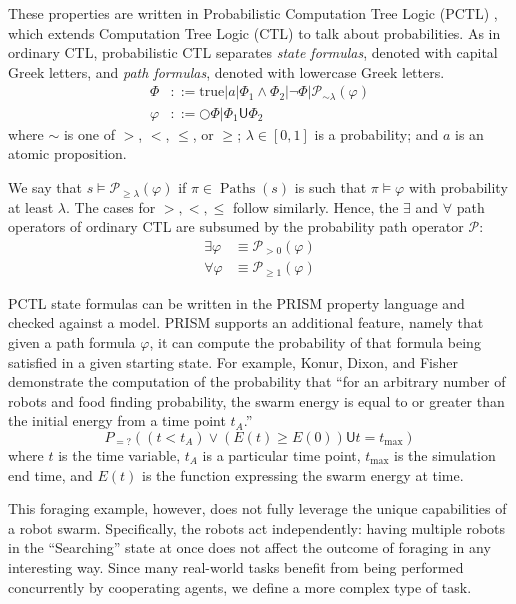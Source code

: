 \documentclass[11pt]{article}
\theoremstyle{definition}
\renewcommand{\phi}{\varphi}
\newcommand{\OR}{\mathbin{\big\vert}}
\renewcommand{\P}[2]{\mathcal{P}_{#1}\left(#2\right)}
\newcommand{\until}{\mathbin{\mathsf{U}}}
\newcommand{\X}{\bigcirc}
\renewcommand{\models}{\vDash}
\newcommand{\Paths}[1]{\operatorname{Paths}\left(#1\right)}
\begin{document}
These properties are written in Probabilistic Computation Tree Logic (PCTL)
\cite{pctl}, which extends Computation Tree Logic (CTL) to talk about
probabilities. As in ordinary CTL, probabilistic CTL separates
\emph{state formulas}, denoted with capital Greek letters, and
\emph{path formulas}, denoted with lowercase Greek letters.
%
\begin{align*}
    \Phi &::= \text{true}
        \OR a
        \OR \Phi_1 \land \Phi_2
        \OR \neg \Phi
        \OR \P{\sim \lambda}{\phi} \\
    \phi &::= \X \Phi \OR \Phi_1 \until \Phi_2
\end{align*}
%
where $\sim$ is one of $>$, $<$, $\leq$, or $\geq$;
$\lambda \in [0,1]$ is a probability;
and $a$ is an atomic proposition.

We say that $s \models \P{\geq\lambda}{\phi}$
if $\pi \in \Paths{s}$ is such that $\pi \models \phi$ with probability at
least $\lambda$.
The cases for $ >, <, \leq $ follow similarly.
%
Hence, the $\exists$ and $\forall$ path operators of ordinary CTL are subsumed
by the probability path operator $\mathcal{P}$:
%
\begin{align*}
    \exists \phi &\equiv \P{>0}{\phi} \\
    \forall \phi &\equiv \P{\geq 1}{\phi}
\end{align*}

PCTL state formulas can be written in the PRISM property language and checked
against a model.
PRISM supports an additional feature, namely that given a path formula $\phi$,
it can compute the probability of that formula being satisfied in a given
starting state.
For example, Konur, Dixon, and Fisher demonstrate the computation of the
probability that ``for an arbitrary number of robots and food finding
probability, the swarm energy is equal to or greater than the initial energy
from a time point $ t_A $.''
%
\begin{equation*}
    P_{=?}((t < t_A) \lor (E(t) \geq E(0)) \until t = t_\text{max} )
\end{equation*}
%
where
$t$ is the time variable,
$t_A$ is a particular time point,
$t_\text{max}$ is the simulation end time, and
$E(t)$ is the function expressing the swarm energy at time.

This foraging example, however, does not fully leverage the unique
capabilities of a robot swarm.
Specifically, the robots act independently:
having multiple robots in the ``Searching'' state at once does not affect the
outcome of foraging in any interesting way.
Since many real-world tasks benefit from being performed concurrently by
cooperating agents, we define a more complex type of task.
\end{document}
